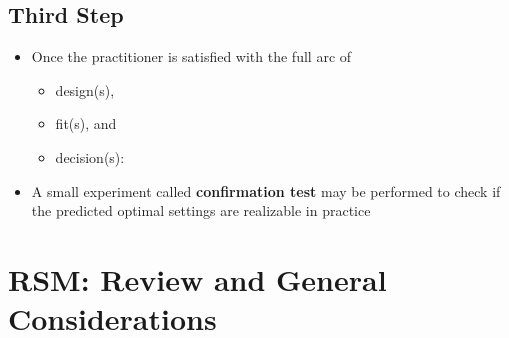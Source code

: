 \documentclass[
  letterpaper,
  DIV=11,
  numbers=noendperiod]{scrreprt}
\providecommand{\tightlist}{%
  \setlength{\itemsep}{0pt}\setlength{\parskip}{0pt}}\usepackage{longtable,booktabs,array}
\begin{document}
\hypertarget{third-step}{%
\subsection{Third Step}\label{third-step}}

\begin{itemize}
\tightlist
\item
  Once the practitioner is satisfied with the full arc of

  \begin{itemize}
  \tightlist
  \item
    design(s),
  \item
    fit(s), and
  \item
    decision(s):
  \end{itemize}
\item
  A small experiment called \textbf{confirmation test} may be performed
  to check if the predicted optimal settings are realizable in practice
\end{itemize}

\hypertarget{rsm-review-and-general-considerations}{%
\section{RSM: Review and General
Considerations}\label{rsm-review-and-general-considerations}}
\end{document}
